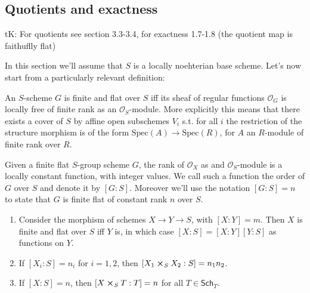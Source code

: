 \documentclass[../Main]{subfiles}
\begin{document}
\subsection{Quotients and exactness}
tK: For quotients see section 3.3-3.4, for exactness 1.7-1.8 (the quotient map is faithuflly flat)

In this section we'll assume that $S$ is a locally noehterian base scheme.
Let's now start from a particularly relevant definition:
\begin{rem}
	An $S$-scheme $G$ is finite and flat over $S$ iff its sheaf of regular functions
	$\mathcal{O}_G$ is locally free of finite rank as an $\mathcal{O}_S$-module.
	More explicitly this means that there exists a cover of $S$ by affine open subschemes
	$V_i$ s.t. for all $i$ the restriction of the structure morphism is of the form
	$\mathrm{Spec}(A) \to \mathrm{Spec}(R)$, for $A$ an $R$-module of finite rank over $R$. 
\end{rem}

\begin{defn}
	Given a finite flat $S$-group scheme $G$, the rank of $\mathcal{O}_X$ as
	and $\mathcal{O}_S$-module is a locally constant function, with integer values.
	We call such a function the order of $G$ over $S$ and denote it by $[G:S]$.
	Moreover we'll use the notation $[G:S] = n$ to state that $G$ is finite flat of
	constant rank $n$ over $S$.
\end{defn}

\begin{prop}[]\leavevmode\vspace{-.2\baselineskip}
\begin{enumerate}
	\item Consider the morphism of schemes $X \to Y \to S$, with $[X:Y] = m$.
		Then $X$ is finite and flat over $S$ iff $Y$ is, in which case
		$[X:S] = [X:Y] [Y:S]$ as functions on $Y$.
		
	\item If $[X_i:S] = n_i$ for $i=1,2$, then
		$[X_1 \cross_{ S } X_2 : S] = n_1n_2$.

	\item If $[X:S] = n$, then $[X \cross_{ S } T : T] = n$
		for all $T \in \mathsf{Sch}_{ T }$.
\end{enumerate}
\end{prop}
\end{document}
